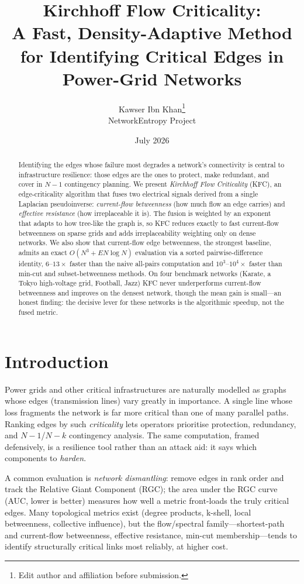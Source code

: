 \documentclass[11pt]{article}
\title{\textbf{Kirchhoff Flow Criticality:\\ A Fast, Density-Adaptive Method for Identifying Critical Edges in Power-Grid Networks}}
\author{Kawser Ibn Khan\thanks{Edit author and affiliation before submission.}\\ \small NetworkEntropy Project}
\date{July 2026}
\begin{document}
\maketitle

\begin{abstract}
Identifying the edges whose failure most degrades a network's connectivity is central
to infrastructure resilience: those edges are the ones to protect, make redundant, and
cover in $N{-}1$ contingency planning. We present \emph{Kirchhoff Flow Criticality}
(KFC), an edge-criticality algorithm that fuses two electrical signals derived from a
single Laplacian pseudoinverse: \emph{current-flow betweenness} (how much flow an edge
carries) and \emph{effective resistance} (how irreplaceable it is). The fusion is
weighted by an exponent that adapts to how tree-like the graph is, so KFC reduces
exactly to fast current-flow betweenness on sparse grids and adds irreplaceability
weighting only on dense networks. We also show that current-flow edge betweenness, the
strongest baseline, admits an exact $O(N^3 + E N \log N)$ evaluation via a sorted
pairwise-difference identity, $6\text{--}13\times$ faster than the naive all-pairs
computation and $10^3\text{--}10^4\times$ faster than min-cut and subset-betweenness
methods. On four benchmark networks (Karate, a Tokyo high-voltage grid, Football, Jazz)
KFC never underperforms current-flow betweenness and improves on the densest network,
though the mean gain is small---an honest finding: the decisive lever for these networks
is the algorithmic speedup, not the fused metric.
\end{abstract}

\section{Introduction}
Power grids and other critical infrastructures are naturally modelled as graphs whose
edges (transmission lines) vary greatly in importance. A single line whose loss
fragments the network is far more critical than one of many parallel paths. Ranking
edges by such \emph{criticality} lets operators prioritise protection, redundancy, and
$N{-}1$/$N{-}k$ contingency analysis. The same computation, framed defensively, is a
resilience tool rather than an attack aid: it says which components to \emph{harden}.

A common evaluation is \emph{network dismantling}: remove edges in rank order and track
the Relative Giant Component (RGC); the area under the RGC curve (AUC, lower is better)
measures how well a metric front-loads the truly critical edges. Many topological
metrics exist (degree products, k-shell, local betweenness, collective influence), but
the flow/spectral family---shortest-path and current-flow betweenness, effective
resistance, min-cut membership---tends to identify structurally critical links most
reliably, at higher cost.
\end{document}

